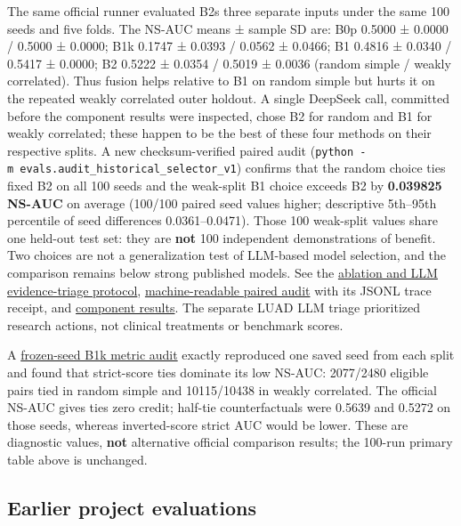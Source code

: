 \documentclass[
  10pt,
]{ctexart}
\begin{document}
The same official runner evaluated B2\textquotesingle s three separate
inputs under the same 100 seeds and five folds. The NS-AUC means ±
sample SD are: B0p 0.5000 ± 0.0000 / 0.5000 ± 0.0000; B1k 0.1747 ±
0.0393 / 0.0562 ± 0.0466; B1 0.4816 ± 0.0340 / 0.5417 ± 0.0000; B2
0.5222 ± 0.0354 / 0.5019 ± 0.0036 (random simple / weakly correlated).
Thus fusion helps relative to B1 on random simple but hurts it on the
repeated weakly correlated outer holdout. A single DeepSeek call,
committed before the component results were inspected, chose B2 for
random and B1 for weakly correlated; these happen to be the best of
these four methods on their respective splits. A new checksum-verified
paired audit
(\texttt{python\ -m\ evals.\allowbreak{}audit\_\allowbreak{}historical\_\allowbreak{}selector\_\allowbreak{}v1}) confirms
that the random choice ties fixed B2 on all 100 seeds and the weak-split
B1 choice exceeds B2 by \textbf{0.039825 NS-AUC} on average (100/100
paired seed values higher; descriptive 5th--95th percentile of seed
differences 0.0361--0.0471). Those 100 weak-split values share one
held-out test set: they are \textbf{not} 100 independent demonstrations
of benefit. Two choices are not a generalization test of LLM-based model
selection, and the comparison remains below strong published models. See
the \href{component_and_llm_adjudication.md}{ablation and LLM
evidence-triage protocol},
\href{../benchmark/results/recess_component_selector_v1_paired_audit.json}{machine-readable
paired audit} with its JSONL trace receipt, and
\href{../benchmark/results/recess_official_component_ablation.json}{component
results}. The separate LUAD LLM triage prioritized research actions, not
clinical treatments or benchmark scores.

A \href{b1k_metric_audit.md}{frozen-seed B1k metric audit} exactly
reproduced one saved seed from each split and found that strict-score
ties dominate its low NS-AUC: 2077/2480 eligible pairs tied in random
simple and 10115/10438 in weakly correlated. The official NS-AUC gives
ties zero credit; half-tie counterfactuals were 0.5639 and 0.5272 on
those seeds, whereas inverted-score strict AUC would be lower. These are
diagnostic values, \textbf{not} alternative official comparison results;
the 100-run primary table above is unchanged.

\subsection{Earlier project
evaluations}\label{earlier-project-evaluations}
\end{document}
